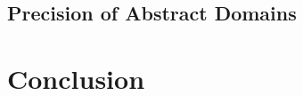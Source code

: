 \documentclass[preprint]{sigplanconf}
\begin{document}
\subsection{Precision of Abstract Domains}


\section{Conclusion}









\end{document}
